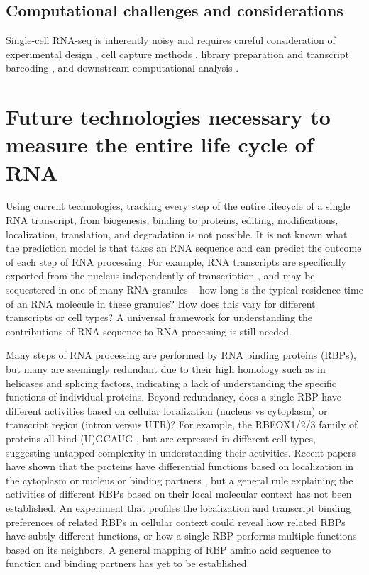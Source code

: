 \subsection{Computational challenges and considerations}

Single-cell RNA-seq is inherently noisy and requires careful consideration of experimental design \cite{Bacher2016-ze}, cell capture methods \cite{Ziegenhain2016-gb}, library preparation and transcript barcoding \cite{Ziegenhain2016-gb,Kivioja2011-dp}, and downstream computational analysis \cite{Stegle2015-tl}.


\section{Future technologies necessary to measure the entire life cycle of RNA}

Using current technologies, tracking every step of the entire lifecycle of a single RNA transcript, from biogenesis, binding to proteins, editing, modifications, localization, translation, and degradation is not possible. It is not known what the prediction model is that takes an RNA sequence and can predict the outcome of each step of RNA processing. For example, RNA transcripts are specifically exported from the nucleus independently of transcription \cite{Nakielny1997-ut,Ohno2012-yw,Siddiqui2012-mv,Strasser2002-xc}, and may be sequestered in one of many RNA granules \cite{Anderson2009-dd,Anderson2006-qf,Blower2013-aj,Kiebler2006-xo,Thomas2011-ha} -- how long is the typical residence time of an RNA molecule in these granules? How does this vary for different transcripts or cell types? A universal framework for understanding the contributions of RNA sequence to RNA processing is still needed.

Many steps of RNA processing are performed by RNA binding proteins (RBPs), but many are seemingly redundant due to their high homology such as in helicases and splicing factors, indicating a lack of understanding the specific functions of individual proteins. Beyond redundancy, does a single RBP have different activities based on cellular localization (nucleus vs cytoplasm) or transcript region (intron versus UTR)? For example, the RBFOX1/2/3 family of proteins all bind (U)GCAUG \cite{Damianov2016-pa,Dredge2011-bk,Weyn-Vanhentenryck2014-vt,Lovci2013-fr,Nutter2016-nu}, but are expressed in different cell types, suggesting untapped complexity in understanding their activities. Recent papers have shown that the proteins have differential functions based on localization in the cytoplasm or nucleus \cite{Dredge2011-bk} or binding partners \cite{Damianov2016-pa}, but a general rule explaining the activities of different RBPs based on their local molecular context has not been established. An experiment that profiles the localization and transcript binding preferences of related RBPs in cellular context could reveal how related RBPs have subtly different functions, or how a single RBP performs multiple functions based on its neighbors. A general mapping of RBP amino acid sequence to function and binding partners has yet to be established.

